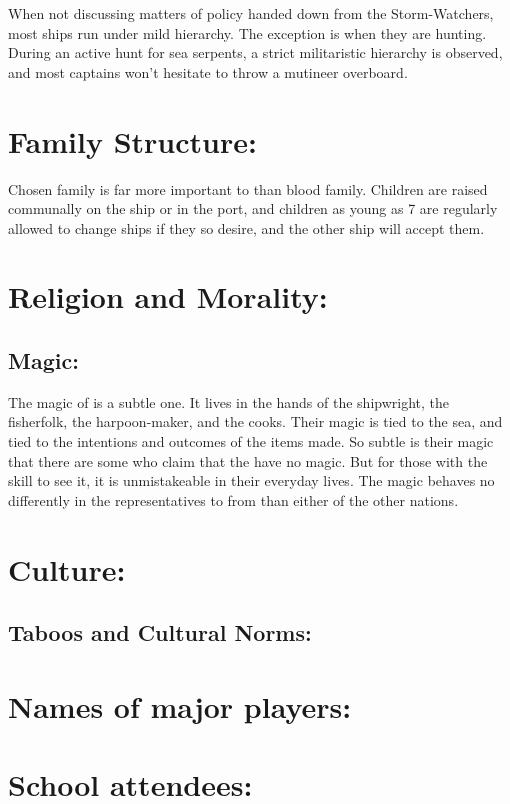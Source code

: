 \documentclass[blue]{GL2020}
\begin{document}
When not discussing matters of policy handed down from the Storm-Watchers, most ships run under mild hierarchy. The exception is when they are hunting. During an active hunt for sea serpents, a strict militaristic hierarchy is observed, and most captains won't hesitate to throw a mutineer overboard.

\section{Family Structure:}
Chosen family is far more important to \pVikings{} than blood family. Children are raised communally on the ship or in the port, and children as young as 7 are regularly allowed to change ships if they so desire, and the other ship will accept them.

\section{Religion and Morality:}

\subsection{Magic:}
The magic of \pShip{} is a subtle one. It lives in the hands of the shipwright, the fisherfolk, the harpoon-maker, and the cooks. Their magic is tied to the sea, and tied to the intentions and outcomes of the items made. So subtle is their magic that there are some who claim that the \pVikings{} have no magic. But for those with the skill to see it, it is unmistakeable in their everyday lives. The magic behaves no differently in the representatives to \pSchool{} from \pShip{} than either of the other nations.

\section{Culture:}

\subsection{Taboos and Cultural Norms:}



\section{Names of major players:}

\section{School attendees:}
\end{document}
